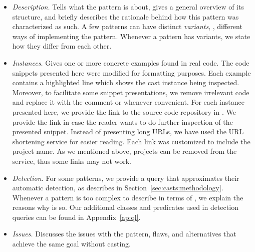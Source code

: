 \begin{itemize}

\item\textit{Description.}
Tells what the pattern is about, gives a general overview of its structure, and
briefly describes the rationale behind how this pattern was characterized as such.
A few patterns can have distinct \emph{variants}, \ie,
different ways of implementing the pattern.
Whenever a pattern has variants,
we state how they differ from each other.

\item\textit{Instances.}
Gives one or more concrete examples found in real code.
The code snippets presented here were modified for formatting purposes.
Each example contains a highlighted line which shows the cast instance being inspected.
Moreover, to facilitate some snippet presentations,
we remove irrelevant code and replace it with the comment
\code{// [...]} or \code{/* [...] */} whenever convenient.
For each instance presented here,
we provide the link to the source code repository in \lgtm{}.
We provide the link in case the reader wants to do further inspection of the presented snippet.
Instead of presenting long \lgtm{} URLs,
we have used the URL shortening service
\href{https://bitly.com/}{\bitly} for easier reading.
Each \bitly{} link was customized to include the project name.
As we mentioned above, projects can be removed from the \lgtm{} service,
thus some links may not work.

\item\textit{Detection.}
For some patterns,
we provide a \ql{} query that approximates their automatic detection,
as describes in Section~\ref{sec:casts:methodology}.
Whenever a pattern is too complex to describe in terms of \ql{},
we explain the reasons why is so.
Our additional \ql{} classes and predicates used in detection queries can be found in Appendix~\ref{ap:ql}.

\item\textit{Issues.}
Discusses the issues with the pattern, flaws, and alternatives that achieve the same goal without casting.

\end{itemize}


